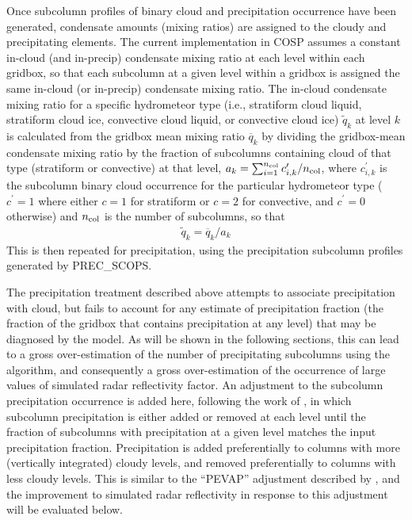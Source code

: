 Once subcolumn profiles of binary cloud and precipitation occurrence have been generated, condensate amounts (mixing ratios) are assigned to the cloudy and precipitating elements. The current implementation in COSP assumes a constant in-cloud (and in-precip) condensate mixing ratio at each level within each gridbox, so that each subcolumn at a given level within a gridbox is assigned the same in-cloud (or in-precip) condensate mixing ratio. The in-cloud condensate mixing ratio for a specific hydrometeor type (i.e., stratiform cloud liquid, stratiform cloud ice, convective cloud liquid, or convective cloud ice) $\tilde{q}_k$ at level $k$ is calculated from the gridbox mean mixing ratio $\overline{q}_k$ by dividing the gridbox-mean condensate mixing ratio by the fraction of subcolumns containing cloud of that type (stratiform or convective) at that level, $a_k = \sum_{i = 1}^{n_{\rm col}} c^\prime_{i, k} / n_{\rm col}$, where $c^{\prime}_{i, k}$ is the subcolumn binary cloud occurrence for the particular hydrometeor type ($c^\prime = 1$ where either $c = 1$ for stratiform or $c = 2$ for convective, and $c^\prime = 0$ otherwise) and $n_{\rm col}$ is the number of subcolumns, so that
\begin{gather}
\tilde{q}_k = \overline{q}_k / a_k
\end{gather}
This is then repeated for precipitation, using the precipitation subcolumn profiles generated by PREC\_SCOPS.

The precipitation treatment described above attempts to associate precipitation with cloud, but fails to account for any estimate of precipitation fraction (the fraction of the gridbox that contains precipitation at any level) that may be diagnosed by the model. As will be shown in the following sections, this can lead to a gross over-estimation of the number of precipitating subcolumns using the \cite{zhang_et_al_2010} algorithm, and consequently a gross over-estimation of the occurrence of large values of simulated radar reflectivity factor. An adjustment to the subcolumn precipitation occurrence is added here, following the work of \cite{dimichele_et_al_2012}, in which subcolumn precipitation is either added or removed at each level until the fraction of subcolumns with precipitation at a given level matches the input precipitation fraction. Precipitation is added preferentially to columns with more (vertically integrated) cloudy levels, and removed preferentially to columns with less cloudy levels. This is similar to the ``PEVAP'' adjustment described by \cite{dimichele_et_al_2012}, and the improvement to simulated radar reflectivity in response to this adjustment will be evaluated below.

